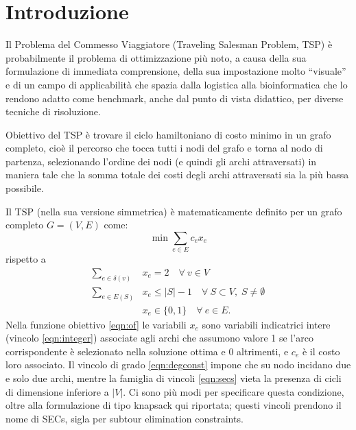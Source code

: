 \chapter{Introduzione}
Il Problema del Commesso Viaggiatore (Traveling Salesman Problem, TSP) è probabilmente il problema di ottimizzazione più noto, a causa della sua formulazione di immediata comprensione, della sua impostazione molto ``visuale'' e di un campo di applicabilità che spazia dalla logistica alla bioinformatica che lo rendono adatto come benchmark, anche dal punto di vista didattico, per diverse tecniche di risoluzione.

Obiettivo del TSP è trovare il ciclo hamiltoniano di costo minimo in un grafo completo, cioè il percorso che tocca tutti i nodi del grafo e torna al nodo di partenza, selezionando l'ordine dei nodi (e quindi gli archi attraversati) in maniera tale che la somma totale dei costi degli archi attraversati sia la più bassa possibile.

Il TSP (nella sua versione simmetrica) è matematicamente definito per un grafo completo $G = (V,E)$ come:
\begin{equation}
  \min \sum_{e \in E}c_ex_e \label{eqn:of}
\end{equation}
rispetto a
\begin{align}
  \sum_{e \in \delta(v)} & x_e = 2 \quad\forall\: v \in V \label{eqn:degconst}\\
  \sum_{e \in E(S)} & x_e \leq |S| - 1 \quad\forall\: S \subset V,\; S \neq \emptyset \label{eqn:secs}\\
  & x_e \in \{0,1\}  \quad \forall\: e \in E. \label{eqn:integer}
\end{align}
Nella funzione obiettivo \ref{eqn:of} le variabili $x_e$ sono variabili indicatrici intere (vincolo \ref{eqn:integer}) associate agli archi che assumono valore 1 se l'arco corrispondente è selezionato nella soluzione ottima e 0 altrimenti, e $c_e$ è il costo loro associato. Il vincolo di grado \ref{eqn:degconst} impone che su nodo incidano due e solo due archi, mentre la famiglia di vincoli \ref{eqn:secs} vieta la presenza di cicli di dimensione inferiore a $|V|$. Ci sono più modi per specificare questa condizione, oltre alla formulazione di tipo knapsack qui riportata; questi vincoli prendono il nome di SECs, sigla per subtour elimination constraints.

